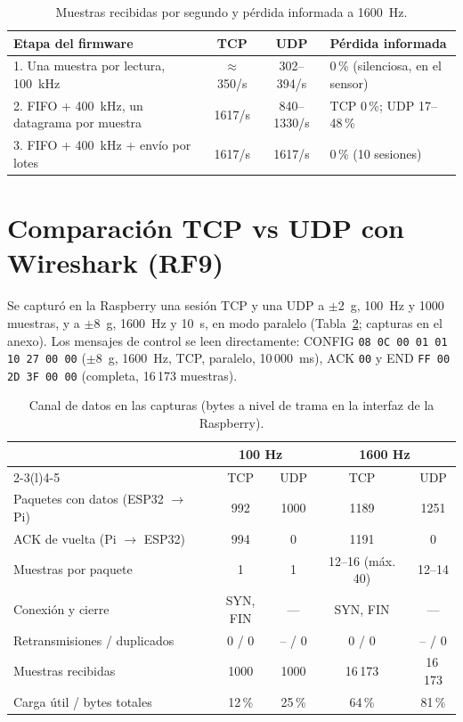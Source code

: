 \documentclass[11pt,a4paper]{report}
\begin{document}
\begin{table}[h]
\centering\small
\caption{Muestras recibidas por segundo y pérdida informada a 1600~Hz.}\label{tab:evolucion}
\begin{tabularx}{\textwidth}{@{}X c c X@{}}
\toprule
Etapa del firmware & TCP & UDP & Pérdida informada \\ \midrule
1. Una muestra por lectura, 100~kHz & $\approx$350/s & 302--394/s & 0\,\% (silenciosa, en el sensor) \\
2. FIFO + 400~kHz, un datagrama por muestra & 1617/s & 840--1330/s & TCP 0\,\%; UDP 17--48\,\% \\
3. FIFO + 400~kHz + envío por lotes & 1617/s & 1617/s & 0\,\% (10 sesiones) \\ \bottomrule
\end{tabularx}
\end{table}

\section{Comparación TCP vs UDP con Wireshark (RF9)}\label{sec:wireshark}
Se capturó en la Raspberry una sesión TCP y una UDP a $\pm$2~g, 100~Hz y 1000 muestras, y a $\pm$8~g, 1600~Hz y 10~s, en modo paralelo (Tabla~\ref{tab:wireshark}; capturas en el anexo). Los mensajes de control se leen directamente: CONFIG \texttt{08 0C 00 01 01 10 27 00 00} ($\pm$8~g, 1600~Hz, TCP, paralelo, 10\,000~ms), ACK \texttt{00} y END \texttt{FF 00 2D 3F 00 00} (completa, 16\,173 muestras).

\begin{table}[h]
\centering\small
\caption{Canal de datos en las capturas (bytes a nivel de trama en la interfaz de la Raspberry).}\label{tab:wireshark}
\begin{tabular}{@{}l cc cc@{}}
\toprule
 & \multicolumn{2}{c}{100 Hz} & \multicolumn{2}{c}{1600 Hz} \\ \cmidrule(lr){2-3}\cmidrule(l){4-5}
 & TCP & UDP & TCP & UDP \\ \midrule
Paquetes con datos (ESP32 $\to$ Pi) & 992 & 1000 & 1189 & 1251 \\
ACK de vuelta (Pi $\to$ ESP32) & 994 & 0 & 1191 & 0 \\
Muestras por paquete & 1 & 1 & 12--16 (máx. 40) & 12--14 \\
Conexión y cierre & SYN, FIN & --- & SYN, FIN & --- \\
Retransmisiones / duplicados & 0 / 0 & -- / 0 & 0 / 0 & -- / 0 \\
Muestras recibidas & 1000 & 1000 & 16\,173 & 16\,173 \\
Carga útil / bytes totales & 12\,\% & 25\,\% & 64\,\% & 81\,\% \\ \bottomrule
\end{tabular}
\end{table}
\end{document}
